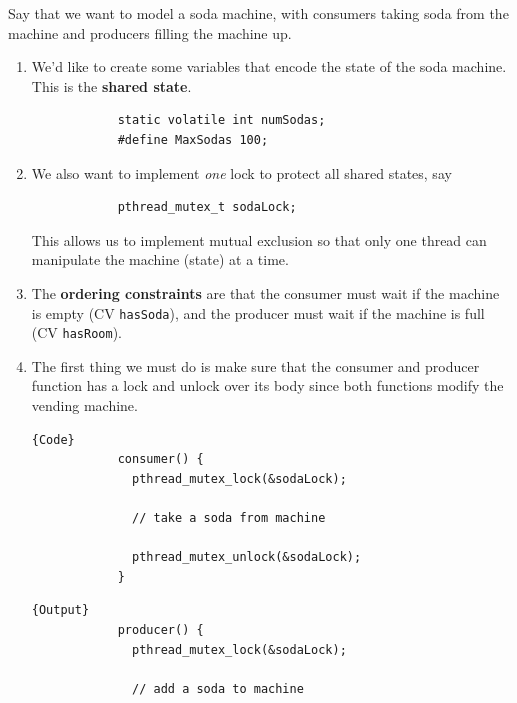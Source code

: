 \documentclass{article}
\begin{document}
    \begin{example}
      Say that we want to model a soda machine, with consumers taking soda from the machine and producers filling the machine up. 
      \begin{enumerate}
        \item We'd like to create some variables that encode the state of the soda machine. This is the \textbf{shared state}. 
          \begin{lstlisting}
            static volatile int numSodas; 
            #define MaxSodas 100; 
          \end{lstlisting}

        \item We also want to implement \textit{one} lock to protect all shared states, say 
          \begin{lstlisting}
            pthread_mutex_t sodaLock; 
          \end{lstlisting}
          This allows us to implement mutual exclusion so that only one thread can manipulate the machine (state) at a time. 

        \item The \textbf{ordering constraints} are that the consumer must wait if the machine is empty (CV \texttt{hasSoda}), and the producer must wait if the machine is full (CV \texttt{hasRoom}). 

        \item The first thing we must do is make sure that the consumer and producer function has a lock and unlock over its body since both functions modify the vending machine. 

          \noindent\begin{minipage}{.5\linewidth}
          \begin{lstlisting}[]{Code}
            consumer() {
              pthread_mutex_lock(&sodaLock); 

              // take a soda from machine

              pthread_mutex_unlock(&sodaLock); 
            }
          \end{lstlisting}
          \end{minipage}
          \hfill
          \begin{minipage}{.49\linewidth}
          \begin{lstlisting}[]{Output}
            producer() {
              pthread_mutex_lock(&sodaLock); 

              // add a soda to machine


\end{lstlisting}
\end{minipage}
\end{enumerate}
\end{example}
\end{document}
